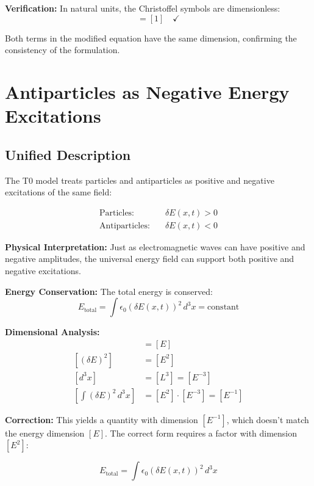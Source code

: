 \documentclass[12pt,a4paper]{report}
\begin{document}
\textbf{Verification:} In natural units, the Christoffel symbols are dimensionless:
\begin{equation}
	[\Gamma^\lambda_{\mu\nu}] = [1] \quad \checkmark
\end{equation}

Both terms in the modified equation have the same dimension, confirming the consistency of the formulation.
	\section{Antiparticles as Negative Energy Excitations}
	\label{sec:antiparticles_negative_energy}
	
\subsection{Unified Description}
\label{subsec:unified_description}

The T0 model treats particles and antiparticles as positive and negative excitations of the same field:

\begin{align}
	\text{Particles:} \quad &\delta E(x,t) > 0 \\
	\text{Antiparticles:} \quad &\delta E(x,t) < 0
\end{align}

\textbf{Physical Interpretation:} Just as electromagnetic waves can have positive and negative amplitudes, the universal energy field can support both positive and negative excitations.

\textbf{Energy Conservation:} The total energy is conserved:
\begin{equation}
	E_{\text{total}} = \int \epsilon_0 (\delta E(x,t))^2 \, d^3x = \text{constant}
\end{equation}

\textbf{Dimensional Analysis:}
\begin{align}
	[\delta E] &= [E] \\
	[(\delta E)^2] &= [E^2] \\
	[d^3x] &= [L^3] = [E^{-3}] \\
	[\int (\delta E)^2 \, d^3x] &= [E^2] \cdot [E^{-3}] = [E^{-1}]
\end{align}

\textbf{Correction:} This yields a quantity with dimension $[E^{-1}]$, which doesn't match the energy dimension $[E]$. The correct form requires a factor with dimension $[E^2]$:

\begin{equation}
	E_{\text{total}} = \int \epsilon_0 (\delta E(x,t))^2 \, d^3x
\end{equation}
\end{document}
